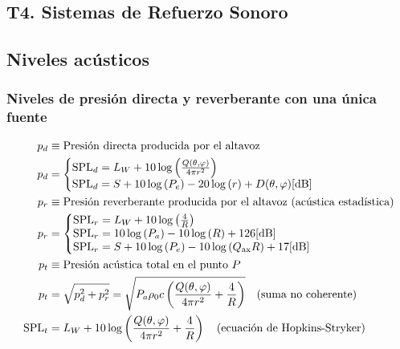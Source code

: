 \documentclass[a4paper, 8pt]{extarticle}
\begin{document}
\begin{multicols}{3}
  \newpage
  \section{T4. Sistemas de Refuerzo Sonoro}

  \subsection{Niveles acústicos}
  \subsubsection{Niveles de presión directa y reverberante con una única fuente}
  \begin{align*}
    p_d          & \equiv \text{Presión directa producida por el altavoz}                                                                                          \\\
    p_d          & = \left\lbrace
    \begin{matrix*}[l]
      \text{SPL}_d = L_W + 10 \log \left( \frac{Q(\theta, \varphi)}{4\pi r^2} \right)\\
      \text{SPL}_d = S + 10 \log \left( P_e \right) -20 \log \left( r \right) + D(\theta, \varphi) [\unit{\dB}]
    \end{matrix*} \right.                                          \\
    p_r          & \equiv \text{Presión reverberante producida por el altavoz (acústica estadística)}                                                              \\
    p_r          & = \left\lbrace
    \begin{matrix*}[l]
      \text{SPL}_r = L_W + 10 \log \left( \frac{4}{R} \right) \\
      \text{SPL}_r = 10 \log \left( P_a \right) - 10 \log \left( R \right) + 126 [\unit{\dB}] \\
      \text{SPL}_r = S + 10 \log \left( P_e \right) - 10 \log \left( Q _{\textnormal{ax}}R \right) + 17 [\unit{\dB}]
    \end{matrix*} \right.       \\
    p_t          & \equiv \text{Presión acústica total en el punto }P                                                                                              \\
    p_t          & = \sqrt{p_d^2 + p_r^2} = \sqrt{P_a \rho _0 c \left( \frac{Q(\theta, \varphi)}{4\pi r^2} + \frac{4}{R} \right)} \quad \text{(suma no coherente)} \\
    \text{SPL}_t & = L_W + 10 \log \left( \frac{Q(\theta, \varphi)}{4\pi r^2} + \frac{4}{R} \right) \quad \text{(ecuación de Hopkins-Stryker)}
  \end{align*}


\end{multicols}
\end{document}
